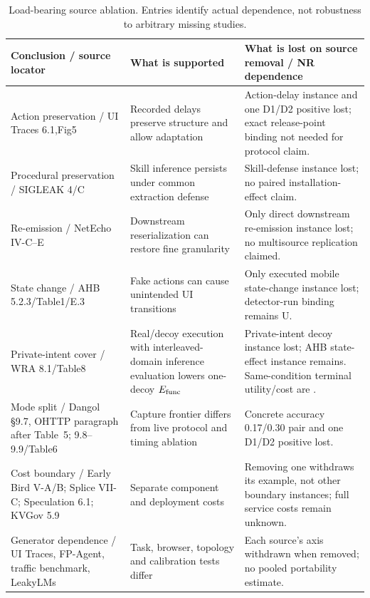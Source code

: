 \begin{table}[t]\centering\footnotesize
\caption{Load-bearing source ablation. Entries identify actual dependence, not robustness to arbitrary missing studies.}\label{tab:source-dependencies}
\begin{tabularx}{\textwidth}{@{}p{}YY@{}}\toprule
Conclusion / source locator & What is supported & What is lost on source removal / NR dependence\\\midrule
Action preservation / UI Traces 6.1,Fig5 & Recorded delays preserve structure and allow adaptation & Action-delay instance and one D1/D2 positive lost; exact release-point binding not needed for protocol claim.\\
Procedural preservation / SIGLEAK 4/C & Skill inference persists under common extraction defense & Skill-defense instance lost; no paired installation-effect claim.\\
Re-emission / NetEcho IV-C--E & Downstream reserialization can restore fine granularity & Only direct downstream re-emission instance lost; no multisource replication claimed.\\
State change / AHB 5.2.3/Table1/E.3 & Fake actions can cause unintended UI transitions & Only executed mobile state-change instance lost; detector-run binding remains U.\\
Private-intent cover / WRA 8.1/Table8 & Real/decoy execution with interleaved-domain inference evaluation lowers one-decoy $E_{\rm func}$ & Private-intent decoy instance lost; AHB state-effect instance remains. Same-condition terminal utility/cost are \NRR{}.\\
Mode split / Dangol \S9.7, OHTTP paragraph after Table~5; 9.8--9.9/Table6 & Capture frontier differs from live protocol and timing ablation & Concrete accuracy 0.17/0.30 pair and one D1/D2 positive lost.\\
Cost boundary / Early Bird V-A/B; Splice VII-C; Speculation 6.1; KVGov 5.9 & Separate component and deployment costs & Removing one withdraws its example, not other boundary instances; full service costs remain unknown.\\
Generator dependence / UI Traces, FP-Agent, traffic benchmark, LeakyLMs & Task, browser, topology and calibration tests differ & Each source's axis withdrawn when removed; no pooled portability estimate.\\\bottomrule
\end{tabularx}\end{table}
